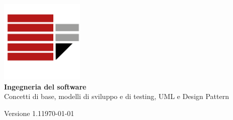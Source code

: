 \documentclass[a4paper,12pt,oneside]{book}
\begin{document}
\begin{titlepage}
    \centering
    
    \includegraphics[width=0.3\textwidth]{assets/logo.png}\\[2cm]
    
    {\huge\bfseries Ingegneria del software}\\[1.5cm]
    
    {\Large Concetti di base, modelli di sviluppo e di testing, UML e Design Pattern}\\[2cm]
  
    \vfill
    
    {\large Versione 1.1}\hfill{\large \today}
        
\end{titlepage}

\tableofcontents








\end{document}
